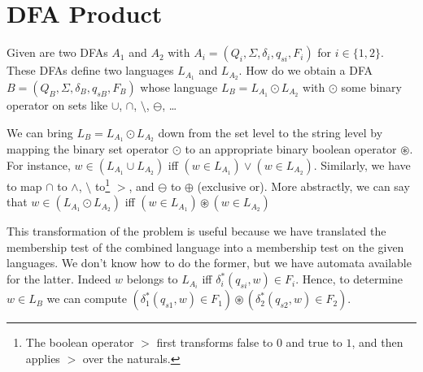 \section{DFA Product}

Given are two DFAs $A_1$ and $A_2$ with $A_i = (Q_i,\Sigma,\delta_i,q_{si},F_i)$ for
$i\in\{1,2\}$. These DFAs define two languages $L_{A_1}$ and $L_{A_2}$. How do we obtain
a DFA $B = (Q_B,\Sigma,\delta_B,q_{sB},F_B)$ whose language $L_B = L_{A_1}
\odot L_{A_2}$ with $\odot$ some binary operator on sets like $\cup$,
$\cap$, $\setminus$, $\ominus$, \ldots

We can bring $L_B = L_{A_1} \odot L_{A_2}$ down from the set level to the
string level by mapping the binary set operator $\odot$ to an appropriate binary
boolean operator $\circledast$. For instance, $w \in (L_{A_1} \cup L_{A_2})$
iff $(w \in L_{A_1}) \vee (w \in L_{A_2})$. Similarly, we have to map $\cap$ to $\wedge$,
$\setminus$ to\footnote{The boolean operator $>$ first transforms false to $0$ and true to $1$, and then applies $>$ over the naturals.} $>$, and $\ominus$ to $\oplus$ (exclusive or). More abstractly, 
we can say that $w \in (L_{A_1} \odot L_{A_2})$ iff $(w \in L_{A_1}) \circledast (w \in L_{A_2})$

This transformation of the problem is useful because we have translated the
membership test of the combined language into a membership test on the given
languages. We don't know how to do the former, but we have automata available
for the latter. Indeed $w$ belongs to $L_{A_i}$ iff $\delta_i^*(q_{si},w) \in
F_i$. Hence, to determine $w \in L_B$ we can compute $(\delta_1^*(q_{s1},w) \in
F_1) \circledast (\delta_2^*(q_{s2},w) \in F_2)$.


